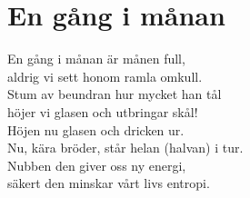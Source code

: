 \section{En gång i månan}
En gång i månan är månen full,\\
aldrig vi sett honom ramla omkull.\\
Stum av beundran hur mycket han tål\\
höjer vi glasen och utbringar skål!\\

Höjen nu glasen och dricken ur.\\
Nu, kära bröder, står helan (halvan) i tur.\\
Nubben den giver oss ny energi,\\
säkert den minskar vårt livs entropi.\\